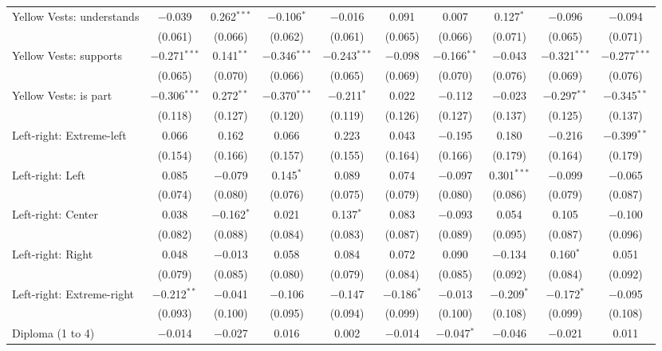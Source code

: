 \documentclass[11pt]{article}
\begin{document}
\begin{table}[!htbp]
{\begin{tabular}{@{\extracolsep{5pt}}lccccccccc}
  Yellow Vests: understands & $-$0.039 & 0.262$^{***}$ & $-$0.106$^{*}$ & $-$0.016 & 0.091 & 0.007 & 0.127$^{*}$ & $-$0.096 & $-$0.094 \\ 
  & (0.061) & (0.066) & (0.062) & (0.061) & (0.065) & (0.066) & (0.071) & (0.065) & (0.071) \\ 
  Yellow Vests: supports & $-$0.271$^{***}$ & 0.141$^{**}$ & $-$0.346$^{***}$ & $-$0.243$^{***}$ & $-$0.098 & $-$0.166$^{**}$ & $-$0.043 & $-$0.321$^{***}$ & $-$0.277$^{***}$ \\ 
  & (0.065) & (0.070) & (0.066) & (0.065) & (0.069) & (0.070) & (0.076) & (0.069) & (0.076) \\ 
  Yellow Vests: is part & $-$0.306$^{***}$ & 0.272$^{**}$ & $-$0.370$^{***}$ & $-$0.211$^{*}$ & 0.022 & $-$0.112 & $-$0.023 & $-$0.297$^{**}$ & $-$0.345$^{**}$ \\ 
  & (0.118) & (0.127) & (0.120) & (0.119) & (0.126) & (0.127) & (0.137) & (0.125) & (0.137) \\ 
  Left-right: Extreme-left & 0.066 & 0.162 & 0.066 & 0.223 & 0.043 & $-$0.195 & 0.180 & $-$0.216 & $-$0.399$^{**}$ \\ 
  & (0.154) & (0.166) & (0.157) & (0.155) & (0.164) & (0.166) & (0.179) & (0.164) & (0.179) \\ 
  Left-right: Left & 0.085 & $-$0.079 & 0.145$^{*}$ & 0.089 & 0.074 & $-$0.097 & 0.301$^{***}$ & $-$0.099 & $-$0.065 \\ 
  & (0.074) & (0.080) & (0.076) & (0.075) & (0.079) & (0.080) & (0.086) & (0.079) & (0.087) \\ 
  Left-right: Center & 0.038 & $-$0.162$^{*}$ & 0.021 & 0.137$^{*}$ & 0.083 & $-$0.093 & 0.054 & 0.105 & $-$0.100 \\ 
  & (0.082) & (0.088) & (0.084) & (0.083) & (0.087) & (0.089) & (0.095) & (0.087) & (0.096) \\ 
  Left-right: Right & 0.048 & $-$0.013 & 0.058 & 0.084 & 0.072 & 0.090 & $-$0.134 & 0.160$^{*}$ & 0.051 \\ 
  & (0.079) & (0.085) & (0.080) & (0.079) & (0.084) & (0.085) & (0.092) & (0.084) & (0.092) \\ 
  Left-right: Extreme-right & $-$0.212$^{**}$ & $-$0.041 & $-$0.106 & $-$0.147 & $-$0.186$^{*}$ & $-$0.013 & $-$0.209$^{*}$ & $-$0.172$^{*}$ & $-$0.095 \\ 
  & (0.093) & (0.100) & (0.095) & (0.094) & (0.099) & (0.100) & (0.108) & (0.099) & (0.108) \\ 
  Diploma (1 to 4) & $-$0.014 & $-$0.027 & 0.016 & 0.002 & $-$0.014 & $-$0.047$^{*}$ & $-$0.046 & $-$0.021 & 0.011 \\ 

\end{tabular}}
\end{table}
\end{document}

